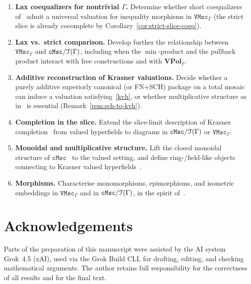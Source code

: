 \documentclass[11pt]{amsart}
\theoremstyle{plain}
\theoremstyle{definition}
\theoremstyle{remark}
\newcommand{\T}{\EuScript{T}}
\newcommand{\cMsc}{\mathtt{cMsc}}
\newcommand{\VMscG}{\mathtt{VMsc}_{\Gamma}}
\begin{document}
\begin{enumerate}[label=(\arabic*)]
\item \textbf{Lax coequalizers for nontrivial \(\Gamma\).} Determine whether short coequalizers of~\cite{NR23} admit a universal valuation for inequality morphisms in \(\VMscG\) (the strict slice is already cocomplete by Corollary~\ref{cor:strict-slice-coeq}).
\item \textbf{Lax vs.\ strict comparison.} Develop further the relationship between \(\VMscG\) and \(\cMsc/\T(\Gamma)\), including when the \(\min\)-product and the pullback product interact with free constructions and with \(\mathbf{VPol}_\Gamma\).
\item \textbf{Additive reconstruction of Krasner valuations.} Decide whether a purely additive superiorly canonical (or FN+SCH) package on a total mosaic can induce a valuation satisfying~\eqref{kvh}, or whether multiplicative structure as in~\cite[Proposition~4.20]{Lin23} is essential (Remark~\ref{rem:sch-to-kvh}).
\item \textbf{Completion in the slice.} Extend the slice-limit description of Krasner completion~\cite{Lin23compl} from valued hyperfields to diagrams in \(\cMsc/\T(\Gamma)\) or \(\VMscG\).
\item \textbf{Monoidal and multiplicative structure.} Lift the closed monoidal structure of \(\cMsc\)~\cite{NR23} to the valued setting, and define ring-/field-like objects connecting to Krasner valued hyperfields~\cite{Lin23,PhD22}.
\item \textbf{Morphisms.} Characterise monomorphisms, epimorphisms, and isometric embeddings in \(\VMscG\) and in \(\cMsc/\T(\Gamma)\), in the spirit of~\cite{NR23}.
\end{enumerate}


\section*{Acknowledgements}

Parts of the preparation of this manuscript were assisted by the AI system Grok~4.5 (xAI), used via the Grok Build CLI, for drafting, editing, and checking mathematical arguments.
The author retains full responsibility for the correctness of all results and for the final text.



\end{document}
